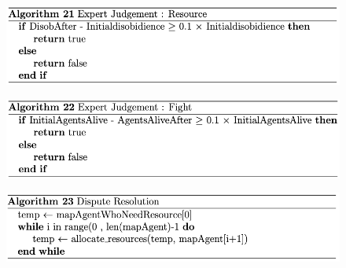 \begin{figure}[htb]
    \centering
    \includegraphics[scale=0.7]{006_team_3_agent_design/FIGS/Algo21.png}
    \label{fig:algo21}
\end{figure}


\begin{figure}[htb]
    \centering
    \includegraphics[scale=0.7]{006_team_3_agent_design/FIGS/Algo22.png}
    \label{fig:algo22}
\end{figure}



\begin{figure}[htb]
    \centering
    \includegraphics[scale=0.7]{006_team_3_agent_design/FIGS/Algo23.png}
    \label{fig:algo23}
\end{figure}


